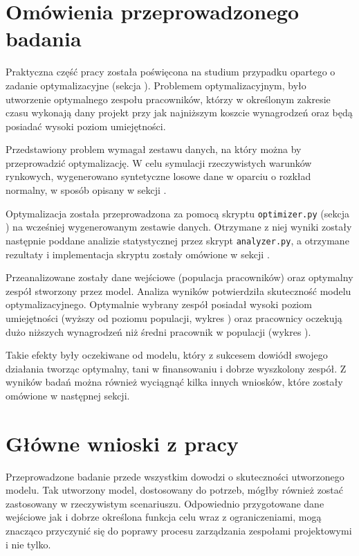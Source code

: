 \section*{Omówienia przeprowadzonego badania}
\par Praktyczna część pracy została poświęcona na studium przypadku opartego o zadanie optymalizacyjne (sekcja ). Problemem optymalizacyjnym, było utworzenie optymalnego zespołu pracowników, którzy w określonym zakresie czasu wykonają dany projekt przy jak najniższym koszcie wynagrodzeń oraz będą posiadać wysoki poziom umiejętności.
\par Przedstawiony problem wymagał zestawu danych, na który można by przeprowadzić optymalizację. W celu symulacji rzeczywistych warunków rynkowych, wygenerowano syntetyczne losowe dane w oparciu o rozkład normalny, w sposób opisany w sekcji . 
\par Optymalizacja została przeprowadzona za pomocą skryptu \verb|optimizer.py| (sekcja ) na wcześniej wygenerowanym zestawie danych. Otrzymane z niej wyniki zostały następnie poddane analizie statystycznej przez skrypt \verb|analyzer.py|, a otrzymane rezultaty i implementacja skryptu zostały omówione w sekcji . 
\par Przeanalizowane zostały dane wejściowe (populacja pracowników) oraz optymalny zespół stworzony przez model. Analiza wyników potwierdziła skuteczność modelu optymalizacyjnego. Optymalnie wybrany zespół posiadał wysoki poziom umiejętności (wyższy od poziomu populacji, wykres ) oraz pracownicy oczekują dużo niższych wynagrodzeń niż średni pracownik w populacji (wykres ). 
\par Takie efekty były oczekiwane od modelu, który z sukcesem dowiódł swojego działania tworząc optymalny, tani w finansowaniu i dobrze wyszkolony zespół. Z wyników badań można również wyciągnąć kilka innych wniosków, które zostały omówione w następnej sekcji.

\section*{Główne wnioski z pracy}
\par Przeprowadzone badanie przede wszystkim dowodzi o skuteczności utworzonego modelu. Tak utworzony model, dostosowany do potrzeb, mógłby również zostać zastosowany w rzeczywistym scenariuszu. Odpowiednio przygotowane dane wejściowe jak i dobrze określona funkcja celu wraz z ograniczeniami, mogą znacząco przyczynić się do poprawy procesu zarządzania zespołami projektowymi i nie tylko. 

